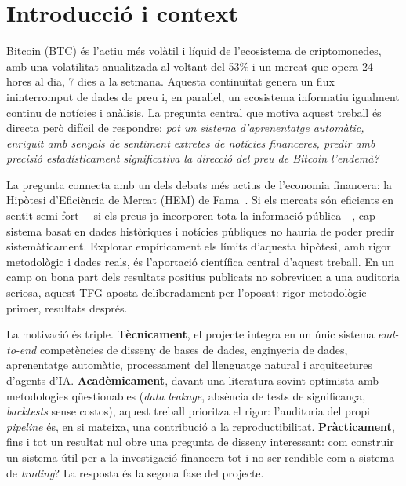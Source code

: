 \documentclass[10pt,twocolumn,a4paper]{article}
\begin{document}
\section{Introducció i context}
Bitcoin (BTC) és l'actiu més volàtil i líquid de l'ecosistema de criptomonedes,
amb una volatilitat anualitzada al voltant del 53\% i un mercat que opera 24
hores al dia, 7 dies a la setmana. Aquesta continuïtat genera un flux ininterromput
de dades de preu i, en paral\textperiodcentered{}lel, un ecosistema informatiu
igualment continu de notícies i anàlisis. La pregunta central que motiva aquest
treball és directa però difícil de respondre: \emph{pot un sistema
d'aprenentatge automàtic, enriquit amb senyals de sentiment extretes de notícies
financeres, predir amb precisió estadísticament significativa la direcció del preu
de Bitcoin l'endemà?}

La pregunta connecta amb un dels debats més actius de l'economia financera: la
Hipòtesi d'Eficiència de Mercat (HEM) de Fama~\cite{fama1970}. Si els mercats són
eficients en sentit semi-fort ---si els preus ja incorporen tota la informació
pública---, cap sistema basat en dades històriques i notícies públiques no hauria
de poder predir sistemàticament. Explorar empíricament els límits d'aquesta
hipòtesi, amb rigor metodològic i dades reals, és l'aportació científica central
d'aquest treball. En un camp on bona part dels resultats positius publicats no
sobreviuen a una auditoria seriosa, aquest TFG aposta deliberadament per l'oposat:
rigor metodològic primer, resultats després.

La motivació és triple. \textbf{Tècnicament}, el projecte integra en un únic sistema
\textit{end-to-end} competències de disseny de bases de dades, enginyeria de dades,
aprenentatge automàtic, processament del llenguatge natural i arquitectures
d'agents d'IA. \textbf{Acadèmicament}, davant una literatura sovint optimista amb
metodologies qüestionables (\textit{data leakage}, absència de tests de significança,
\textit{backtests} sense costos), aquest treball prioritza el rigor: l'auditoria del
propi \textit{pipeline} és, en si mateixa, una contribució a la reproductibilitat.
\textbf{Pràcticament}, fins i tot un resultat nul obre una pregunta de disseny
interessant: com construir un sistema útil per a la investigació financera tot i no
ser rendible com a sistema de \textit{trading}? La resposta és la segona fase del
projecte.
\end{document}
